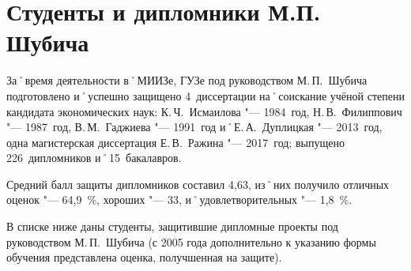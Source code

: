 ﻿\section{Студенты и дипломники М.П. Шубича}
За˚время деятельности в˚МИИЗе, ГУЗе под руководством М.\,П.~Шубича подготовлено и˚успешно защищено 4~диссертации на˚соискание учёной степени кандидата экономических наук: К.\,Ч.~Исмаилова "--- 1984~год, Н.\,В.~Филиппович "--- 1987~год, В.\,М.~Гаджиева "--- 1991~год и˚Е.\,А.~Дуплицкая "--- 2013~год, одна магистерская диссертация Е.\,В.~Ражина "--- 2017~год; выпущено 226~дипломников и˚15~бакалавров.

Средний балл защиты дипломников составил 4,63, из˚них получило отличных оценок "--- 64,9~\%, хороших "--- 33, и˚удовлетворительных "--- 1,8~\%.

В списке ниже даны студенты, защитившие дипломные проекты под руководством М.\,П.~Шубича (с 2005 года дополнительно к указанию формы обучения представлена  оценка, получшенная на защите).

